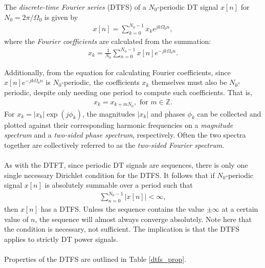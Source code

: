 \documentclass{report}
\begin{document}
\begin{tcolorbox}[width=\textwidth,colback={white}, sharp corners]
The \emph{discrete-time Fourier series} (DTFS) of a $N_0$-periodic DT signal $x[n]$ for $N_0=2\pi/\Omega_0$ is given by
    \begin{align}
        x[n] = \sum_{k=0}^{N_0-1} x_k e^{jk\Omega_0 n},
    \end{align}
    where the \emph{Fourier coefficients} are calculated from the summation: 
    \begin{align}
        x_k = \frac{1}{N_0} \sum_{n=0}^{N_0-1} x[n] e^{-jk\Omega_0 n}.
    \end{align}
\end{tcolorbox}
\noindent Additionally, from the equation for calculating Fourier coefficients, since $x[n]e^{-jk\Omega_0 n}$ is $N_0$-periodic, the coefficients $x_k$ themselves must also be $N_0$-periodic, 
despite only needing one period to compute such coefficients. That is,
\begin{align}
    x_k = x_{k+mN_0}, \text{ for } m\in\mathbb{Z}.
\end{align}
For $x_k=|x_k|\exp(j\phi_k)$, the magnitudes $|x_k|$ and phases $\phi_k$ can be collected and plotted against their corresponding harmonic frequencies 
on a \emph{magnitude spectrum} and a \emph{two-sided phase spectrum}, respectively. Often the two spectra together are collectively referred to as the 
\emph{two-sided Fourier spectrum}. 
\\ \\
As with the DTFT, since periodic DT signals are sequences, there is only one single necessary Dirichlet condition for the DTFS. It follows that if $N_0$-periodic signal $x[n]$ is absolutely summable 
over a period such that 
\begin{align}
    \sum_{n=0}^{N_0-1} |x[n]| < \infty,
\end{align}
then $x[n]$ has a DTFS. Unless the sequence contains the value $\pm\infty$ at a certain value of $n$, the sequence will almost always converge absolutely. Note here that the condition 
is necessary, not sufficient. The implication is that the DTFS applies to strictly DT power signals. 
\\ \\
Properties of the DTFS are outlined in Table \ref{dtfs_prop}.
\end{document}
